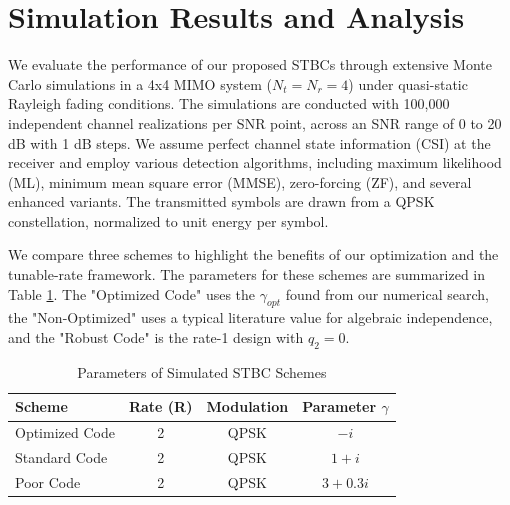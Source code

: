 \section{Simulation Results and Analysis}
We evaluate the performance of our proposed STBCs through extensive Monte Carlo simulations in a 4x4 MIMO system (\(N_t = N_r = 4\)) under quasi-static Rayleigh fading conditions. The simulations are conducted with 100,000 independent channel realizations per SNR point, across an SNR range of 0 to 20 dB with 1 dB steps. We assume perfect channel state information (CSI) at the receiver and employ various detection algorithms, including maximum likelihood (ML), minimum mean square error (MMSE), zero-forcing (ZF), and several enhanced variants. The transmitted symbols are drawn from a QPSK constellation, normalized to unit energy per symbol.

We compare three schemes to highlight the benefits of our optimization and the tunable-rate framework. The parameters for these schemes are summarized in Table \ref{tab:params}. The "Optimized Code" uses the \(\gamma_{opt}\) found from our numerical search, the "Non-Optimized" uses a typical literature value for algebraic independence, and the "Robust Code" is the rate-1 design with \(q_2 = 0\).

\begin{table}[h]
\caption{Parameters of Simulated STBC Schemes}
\label{tab:params}
\centering
\begin{tabular}{|l|c|c|c|}
\hline
\textbf{Scheme} & \textbf{Rate (R)} & \textbf{Modulation} & \textbf{Parameter \(\gamma\)} \\
\hline
Optimized Code & 2 & QPSK & \(-i\) \\
Standard Code & 2 & QPSK & \(1 + i\) \\
Poor Code & 2 & QPSK & \(3 + 0.3i\) \\
\hline
\end{tabular}
\end{table}

